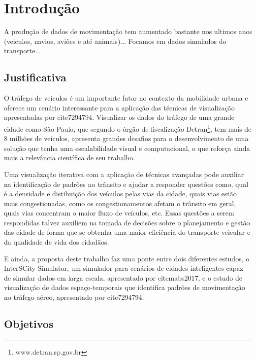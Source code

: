 \chapter{Introdução}
\label{cap:introducao}

A produção de dados de movimentação tem aumentado bastante nos ultimos anos
(veiculos, navios, aviões e até animais)...
Focamos em dados simulados do transporte...


\section{Justificativa}
\label{sec:justificativa}

O tráfego de veículos é um importante fator no contexto da mobilidade urbana
e oferece um cenário interessante para a aplicação das técnicas de visualização
apresentadas por cite{7294794}. Visualizar os dados do tráfego de uma grande
cidade como São Paulo, que segundo o órgão de fiscalização Detran\footnote{www.detran.sp.gov.br},
tem mais de 8 milhões de veículos, apresenta grandes desafios para o desenvolvimento de uma solução que
tenha uma escalabilidade visual e computacional, o que reforça ainda mais a
relevância científica de seu trabalho.

Uma visualização iterativa com a aplicação de técnicas avançadas pode auxiliar
na identificação de padrões no trânsito e ajudar a responder questões como,
qual é a densidade e distibuição dos veículos pelas vias da cidade, quais vias
estão mais congestionadas, como os congestionamentos afetam o trânsito em geral,
quais vias concentram o maior fluxo de veículos, etc. Essas questões
a serem respondidas talvez auxiliem na tomada de decisões sobre o planejamento e
gestão das cidade de forma que se obtenha uma maior eficiência do transporte
veicular e da qualidade de vida dos cidadãos.

E ainda, a proposta deste trabalho faz uma ponte entre dois diferentes estudos,
o InterSCity Simulator, um simulador para cenários de cidades inteligentes capaz
de simular dados em larga escala, apresentado por cite{mabs2017}, e o estudo de visualização
de dados espaço-temporais que identifica padrões de movimentação no tráfego
aéreo, apresentado por cite{7294794}.

\section{Objetivos}
\label{sec:objetivos}

